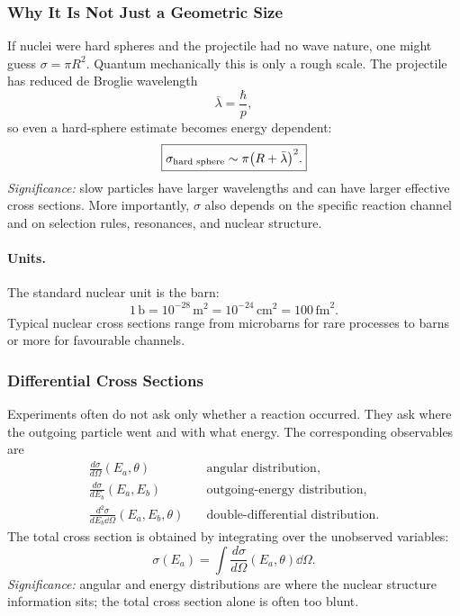 \subsubsection*{Why It Is Not Just a Geometric Size}
If nuclei were hard spheres and the projectile had no wave nature, one might
guess $\sigma=\pi R^2$. Quantum mechanically this is only a rough scale. The
projectile has reduced de Broglie wavelength
\begin{equation}
  \label{eq:lec10:reduced_wavelength}
  \bar\lambda = \frac{\hbar}{p},
\end{equation}
so even a hard-sphere estimate becomes energy dependent:
\begin{equation}
  \label{eq:lec10:hard_sphere}
  \boxed{\sigma_{\text{hard sphere}}\sim \pi\qty(R+\bar\lambda)^2.}
\end{equation}
\textit{Significance:} slow particles have larger wavelengths and can have
larger effective cross sections. More importantly, $\sigma$ also depends on the
specific reaction channel and on selection rules, resonances, and nuclear
structure.

\paragraph{Units.}
The standard nuclear unit is the barn:
\begin{equation}
  \label{eq:lec10:barn}
  \boxed{1\,\text{b}=10^{-28}\,\text{m}^2=10^{-24}\,\text{cm}^2
  =100\,\text{fm}^2.}
\end{equation}
Typical nuclear cross sections range from microbarns for rare processes to barns
or more for favourable channels.

\subsubsection*{Differential Cross Sections}
Experiments often do not ask only whether a reaction occurred. They ask where
the outgoing particle went and with what energy. The corresponding observables
are
\begin{align}
  \label{eq:lec10:diff_cross_sections}
  \frac{d\sigma}{d\Omega}(E_a,\theta)
    &\quad\text{angular distribution},\\
  \frac{d\sigma}{dE_b}(E_a,E_b)
    &\quad\text{outgoing-energy distribution},\\
  \frac{d^2\sigma}{dE_b\dd{\Omega}}(E_a,E_b,\theta)
    &\quad\text{double-differential distribution}.
\end{align}
The total cross section is obtained by integrating over the unobserved variables:
\begin{equation}
  \label{eq:lec10:integral_cross_section}
  \boxed{\sigma(E_a)=\int \frac{d\sigma}{d\Omega}(E_a,\theta)\dd{\Omega}.}
\end{equation}
\textit{Significance:} angular and energy distributions are where the nuclear
structure information sits; the total cross section alone is often too blunt.

